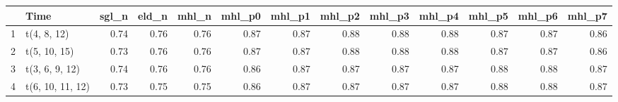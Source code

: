 \begin{table}[ht]
\centering
\begin{tabular}{rlrrrrrrrrrrr}
  \hline
 & Time & sgl\_n & eld\_n & mhl\_n & mhl\_p0 & mhl\_p1 & mhl\_p2 & mhl\_p3 & mhl\_p4 & mhl\_p5 & mhl\_p6 & mhl\_p7 \\ 
  \hline
1 & t(4, 8, 12) & 0.74 & 0.76 & 0.76 & 0.87 & 0.87 & 0.88 & 0.88 & 0.88 & 0.87 & 0.87 & 0.86 \\ 
  2 & t(5, 10, 15) & 0.73 & 0.76 & 0.76 & 0.87 & 0.87 & 0.88 & 0.88 & 0.88 & 0.87 & 0.87 & 0.86 \\ 
  3 & t(3, 6, 9, 12) & 0.74 & 0.76 & 0.76 & 0.86 & 0.87 & 0.87 & 0.87 & 0.87 & 0.88 & 0.88 & 0.87 \\ 
  4 & t(6, 10, 11, 12) & 0.73 & 0.75 & 0.75 & 0.86 & 0.87 & 0.87 & 0.87 & 0.87 & 0.88 & 0.88 & 0.87 \\ 
   \hline
\end{tabular}
\end{table}
